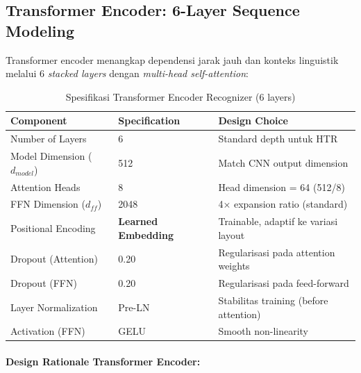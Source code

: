 
\subsection{Transformer Encoder: 6-Layer Sequence Modeling}
\label{appendix:recognizer-transformer}

Transformer encoder menangkap dependensi jarak jauh dan konteks linguistik melalui 6 \textit{stacked layers} dengan \textit{multi-head self-attention}:

\begin{table}[H]
\centering
\caption{Spesifikasi Transformer Encoder Recognizer (6 layers)}
\label{tab:appendix-recognizer-transformer}
\small
\begin{tabular}{|l|l|l|}
\hline
\textbf{Component} & \textbf{Specification} & \textbf{Design Choice} \\
\hline
Number of Layers & 6 & Standard depth untuk HTR \\
\hline
Model Dimension ($d_{model}$) & 512 & Match CNN output dimension \\
\hline
Attention Heads & 8 & Head dimension = 64 (512/8) \\
\hline
FFN Dimension ($d_{ff}$) & 2048 & 4× expansion ratio (standard) \\
\hline
Positional Encoding & \textbf{Learned Embedding} & Trainable, adaptif ke variasi layout \\
\hline
Dropout (Attention) & 0.20 & Regularisasi pada attention weights \\
\hline
Dropout (FFN) & 0.20 & Regularisasi pada feed-forward \\
\hline
Layer Normalization & Pre-LN & Stabilitas training (before attention) \\
\hline
Activation (FFN) & GELU & Smooth non-linearity \\
\hline
\end{tabular}
\end{table}

\paragraph{Design Rationale Transformer Encoder:}

